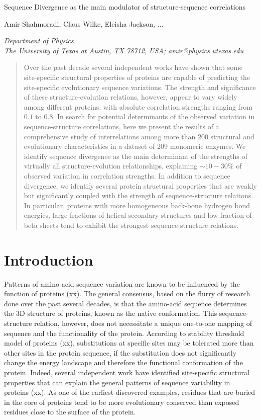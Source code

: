 \documentclass[11pt]{article}
\makeatletter
\newcommand\pubnumber{}
\newcommand\pubdate{\today}
\def\affiliation{Department of Physics \\
The University of Texas at Austin, TX 78712, USA; amir@physics.utexas.edu}
\def\Title#1{\begin{center} {\Large #1 } \end{center}}
\def\Author#1{\begin{center}{ \sc #1} \end{center}}
\def\Address#1{\begin{center}{ \it #1} \end{center}}
\newcommand\pubblock{\rightline{\begin{tabular}{l} \pubnumber\\
         \pubdate  \end{tabular}}}
\newenvironment{Abstract}{\begin{quotation}  }{\end{quotation}}
\makeatother
\begin{document}
\begin{titlepage}
\pubblock

\vfill
\Title{Sequence Divergence as the main modulator of structure-sequence correlations}
\vfill
\Author{Amir Shahmoradi, Claus Wilke, Eleisha Jackson, ...}%
\Address{\affiliation}
\vfill
\begin{Abstract}
    Over the past decade several independent works have shown that some site-specific structural properties of proteins are capable of predicting the site-specific evolutionary sequence variations. The strength and significance of these structure-evolution relations, however, appear to vary widely among different proteins, with absolute correlation strengths ranging from $0.1$ to $0.8$. In search for potential determinants of the observed variation in sequence-structure correlations, here we present the results of a comprehensive study of interrelations among more than $200$ structural and evolutionary characteristics in a dataset of 209 monomeric enzymes. We identify sequence divergence as the main determinant of the strengths of virtually all structure-evolution relationships, explaining $\sim10-30\%$ of observed variation in correlation strengths. In addition to sequence divergence, we identify several protein structural properties that are weakly but significantly coupled with the strength of sequence-structure relations. In particular, proteins with more homogeneous back-bone hydrogen bond energies, large fractions of helical secondary structures and low fraction of beta sheets tend to exhibit the strongest sequence-structure relations.
\end{Abstract}
\vfill
\vfill
\end{titlepage}
\def\thefootnote{\fnsymbol{footnote}}
\setcounter{footnote}{0}
%

\section{Introduction}
\label{sec:intro}

    Patterns of amino acid sequence variation are known to be influenced by the function of proteins (xx). The general consensus, based on the flurry of research done over the past several decades, is that the amino-acid sequence determines the 3D structure of proteins, known as the native conformation. This sequence-structure relation, however, does not necessitate a unique one-to-one mapping of sequence and the functionality of the protein. According to stability threshold model of proteins (xx), substitutions at specific sites may be tolerated more than other sites in the protein sequence, if the substitution does not significantly change the energy landscape and therefore the functional conformation of the protein. Indeed, several independent work have identified site-specific structural properties that can explain the general patterns of sequence variability in proteins (xx). As one of the earliest discovered examples, residues that are buried in the core of proteins tend to be more evolutionary conserved than exposed residues close to the surface of the protein.
    \\
\end{document}
